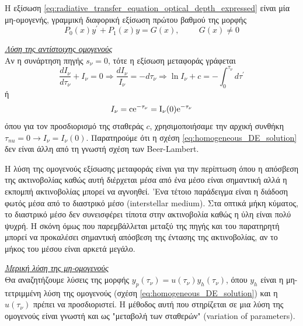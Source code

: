 Η εξίσωση \eqref{eq:radiative_transfer_equation_optical_depth_expressed} είναι μία μη-ομογενής, γραμμική διαφορική εξίσωση πρώτου βαθμού της μορφής $$P_0 (x) y^{\prime} + P_1 (x) y = G(x), \hspace{1cm} G(x) \neq 0$$


\underline{\textit{Λύση της αντίστοιχης ομογενούς}}\\
Αν η συνάρτηση πηγής $s_{\nu} = 0$, τότε η εξίσωση μεταφοράς γράφεται
\begin{equation*}
    \frac{dI_{\nu}}{d\tau_{\nu}} + I_{\nu} = 0 \Rightarrow \frac{dI_{\nu}}{I_{\nu}} = - d\tau_{\nu} \Rightarrow \ln{I_{\nu}} + c = - \int_{0}^{\tau_{\nu}} d\tau^{\prime} 
\end{equation*}
ή
\begin{equation}
    \label{eq:homogeneous_DE_solution}
    I_{\nu} = \rm c e^{- \tau_{\nu}} = I_{\nu} (0) e^{- \tau_{\nu}}
\end{equation}
όπου για τον προσδιορισμό της σταθεράς $c$, χρησιμοποιήσαμε την αρχική συνθήκη $\tau_{nu} = 0 \longrightarrow I_{\nu} = I_{\nu} (0)$. Παρατηρούμε ότι η σχέση \eqref{eq:homogeneous_DE_solution} δεν είναι άλλη από τη γνωστή σχέση των Beer-Lambert.

Η λύση της ομογενούς εξίσωσης μεταφοράς είναι για την περίπτωση όπου η απόσβεση της ακτινοβολίας καθώς αυτή διέρχεται μέσα από ένα μέσο είναι σημαντική αλλά η εκπομπή ακτινοβολίας μπορεί να αγνοηθεί. 'Ενα τέτοιο παράδειγμα είναι η διάδοση φωτός μέσα από το διαστρικό μέσο (interstellar medium). Στα οπτικά μήκη κύματος, το διαστρικό μέσο δεν συνεισφέρει τίποτα στην ακτινοβολία καθώς η ύλη είναι πολύ ψυχρή. Η σκόνη όμως που παρεμβάλλεται μεταξύ της πηγής και του παρατηρητή μπορεί να προκαλέσει σημαντική απόσβεση της έντασης της ακτινοβολίας, αν το μήκος του μέσου είναι αρκετά μεγάλο.

\underline{\textit{Μερική λύση της μη-ομογενούς}}\\
Θα αναζητήζουμε λύσεις της μορφής $y_p(\tau_{\nu}) = u(\tau_{\nu}) y_h (\tau_{\nu})$, όπου $y_h$ είναι η μη-τετριμμένη λύση της ομογενούς (σχέση \eqref{eq:homogeneous_DE_solution}) και η $u(\tau_{\nu})$ πρέπει να προσδιοριστεί.
Η μέθοδος αυτή που στηρίζεται σε μια λύση της ομογενούς είναι γνωστή και ως "μεταβολή των σταθερών" (variation of parameters).

